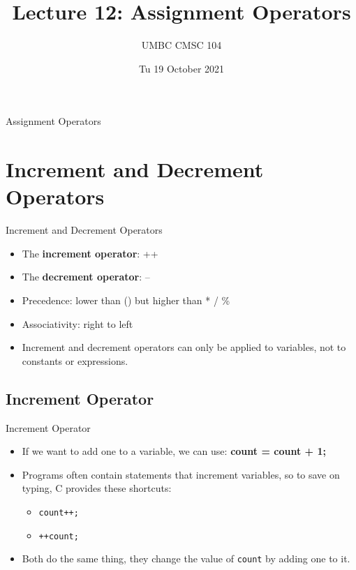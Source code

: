 \documentclass[graphics]{beamer}
\title{Lecture 12: Assignment Operators}
\author{UMBC CMSC 104}
\date{Tu 19 October 2021}
\begin{document}
\begin{frame}{}
\centering
    Assignment Operators
\end{frame}

\frame{\tableofcontents}

\section{Increment and Decrement Operators}
\begin{frame}{Increment and Decrement Operators}
    \begin{itemize}
        \item The \textbf{increment operator}: ++
        \item The \textbf{decrement operator}: --
        \item Precedence: lower than () but higher than * / \%
        \item Associativity: right to left
        \item Increment and decrement operators can only be applied to variables, not to constants or expressions.
    \end{itemize}
\end{frame}

\subsection{Increment Operator}
\begin{frame}{Increment Operator}
    \begin{itemize}
        \item If we want to add one to a variable, we can use: \textbf{count = count + 1;}
        \item Programs often contain statements that increment variables, so to save on typing, C provides these shortcuts:
        \begin{itemize}
            \item \texttt{count++;}
            \item \texttt{++count;}
        \end{itemize}
        \item Both do the same thing, they change the value of \texttt{count} by adding one to it.
    \end{itemize}
\end{frame}
\end{document}
